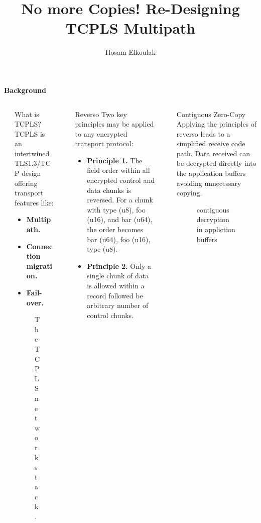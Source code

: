 \documentclass[final]{beamer}
\title{No more Copies! Re-Designing TCPLS Multipath}
\author{Hosam Elkoulak}
\institute[shortinst]{\inst{1} University of Namur}
\newlength{\sepwidth}
\newlength{\colwidth}
\newcommand{\separatorcolumn}{\begin{column}{\sepwidth}\end{column}}
\newcommand{\multicolumntitle}[1]{%
  \begin{center}
  \vspace{0.5cm} %
  {\bfseries \LARGE #1} %
  \vspace{0.5cm}
  \end{center}
}
\begin{document}
  \begin{frame}[t]
    \multicolumntitle{Background}
    \begin{columns}[t]
      \separatorcolumn

      \begin{column}{\colwidth}
        \begin{block}{What is TCPLS?}
          TCPLS is an intertwined TLS1.3/TCP design offering transport features like:
          \begin{itemize}
            \item \textbf{Multipath.}
            \item \textbf{Connection migration.}
            \item \textbf{Fail-over.}
          \end{itemize}
          \begin{figure}
            \centering
            
            \caption{The TCPLS network stack.}
            \label{fig:tcpls}
          \end{figure}
        \end{block}
      \end{column}
      \separatorcolumn

      \begin{column}{\colwidth}
        \begin{block}{Reverso\cite{rochet2024improvingencryptedtransportprotocol}}
          Two key principles may be applied to any encrypted transport protocol:
          \begin{itemize}
            \item \textbf{Principle 1.} The field order within all encrypted control and data chunks is reversed.
            For a chunk with type (u8), foo (u16), and bar (u64), the order becomes bar (u64), foo (u16), type (u8).
            \item \textbf{Principle 2.} Only a single chunk of data is allowed within a record followed be arbitrary
            number of control chunks.
          \end{itemize}
        \end{block}
      \end{column}
      \separatorcolumn

      \begin{column}{\colwidth}
        \begin{block}{Contiguous Zero-Copy}
          Applying the principles of reverso leads to a simplified receive code path.
          Data received can be decrypted directly into the application buffers avoiding unnecessary copying.
          \begin{figure}
            \centering
            
            \caption{contiguous decryption in appliction buffers}
            \label{fig:zero-copy}
          \end{figure}
        \end{block}
      \end{column}


\end{columns}
\end{frame}
\end{document}
